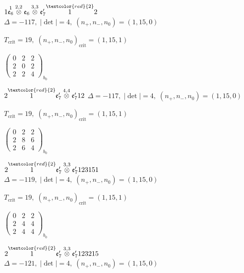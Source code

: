 \documentclass[10pt]{article}
\begin{document}
$1\overset{1}{\mathfrak{e}_6}\overset{2,2}{\otimes}\mathfrak{e}_6\overset{3,3}{\otimes}\mathfrak{e}_7'\overset{\textcolor{red}{2}}{1}2$ \quad $\Delta=-117,\; |\det|=4,\; (n_+,n_-,n_0)=(1,15,0)$

\hspace{1em}$T_{\text{crit}}=19,\; (n_+,n_-,n_0)_{\text{crit}}=(1,15,1)$

\hspace{2em}$\left(\begin{smallmatrix}0 & 2 & 2 \\ 2 & 0 & 2 \\ 2 & 2 & 4\end{smallmatrix}\right)_{\!b_0}$

\smallskip

$2\overset{\textcolor{red}{2}}{1}\mathfrak{e}_7'\overset{4,4}{\otimes}\mathfrak{e}_7'12$ \quad $\Delta=-117,\; |\det|=4,\; (n_+,n_-,n_0)=(1,15,0)$

\hspace{1em}$T_{\text{crit}}=19,\; (n_+,n_-,n_0)_{\text{crit}}=(1,15,1)$

\hspace{2em}$\left(\begin{smallmatrix}0 & 2 & 2 \\ 2 & 8 & 6 \\ 2 & 6 & 4\end{smallmatrix}\right)_{\!b_0}$

\smallskip

$2\overset{\textcolor{red}{2}}{1}\mathfrak{e}_7'\overset{3,3}{\otimes}\mathfrak{e}_7'123151$ \quad $\Delta=-119,\; |\det|=4,\; (n_+,n_-,n_0)=(1,15,0)$

\hspace{1em}$T_{\text{crit}}=19,\; (n_+,n_-,n_0)_{\text{crit}}=(1,15,1)$

\hspace{2em}$\left(\begin{smallmatrix}0 & 2 & 2 \\ 2 & 4 & 4 \\ 2 & 4 & 4\end{smallmatrix}\right)_{\!b_0}$

\smallskip

$2\overset{\textcolor{red}{2}}{1}\mathfrak{e}_7'\overset{3,3}{\otimes}\mathfrak{e}_7'123215$ \quad $\Delta=-121,\; |\det|=4,\; (n_+,n_-,n_0)=(1,15,0)$
\end{document}
